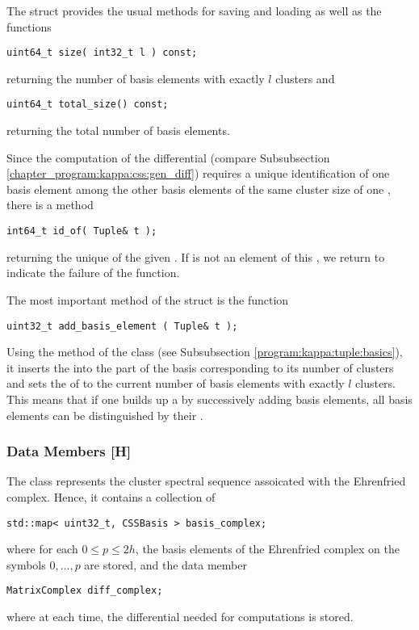 The struct  provides the usual methods for saving and loading as well as the functions
\begin{lstlisting}
uint64_t size( int32_t l ) const;
\end{lstlisting}
returning the number of basis elements with exactly $l$ clusters and 
\begin{lstlisting}
uint64_t total_size() const;
\end{lstlisting}
returning the total number of basis elements.

Since the computation of the differential (compare Subsubsection \ref{chapter_program:kappa:css:gen_diff}) requires 
a unique identification of one basis element among the other basis elements of the same cluster size of one , 
there is a method
\begin{lstlisting}
int64_t id_of( Tuple& t );
\end{lstlisting} 
returning the unique  of the given  . 
If  is not an element of this , we return  to indicate the failure of the function.

The most important method of the struct  is the function
\begin{lstlisting}
uint32_t add_basis_element ( Tuple& t );
\end{lstlisting}

Using the method  of the class  (see Subsubsection \ref{program:kappa:tuple:basics}),
it inserts the   into the part of the basis corresponding to its number of clusters
and sets the  of  to the current number of basis elements with exactly $l$ clusters. 
This means that if one builds up a  by successively adding basis elements,
all basis elements can be distinguished by their .

\subsubsection{Data Members [H]}
\label{chapter_program:kappa:css:data_members}

The class  represents the cluster spectral sequence assoicated with the Ehrenfried complex.
Hence, it contains a collection of  
\begin{lstlisting}
std::map< uint32_t, CSSBasis > basis_complex;
\end{lstlisting}
where for each $0 \leq p \leq 2h$, the basis elements of the Ehrenfried complex on the symbols $0, \dotsc, p$ are stored,
and the data member
\begin{lstlisting}
MatrixComplex diff_complex;
\end{lstlisting}
where at each time, the differential needed for computations is stored.

